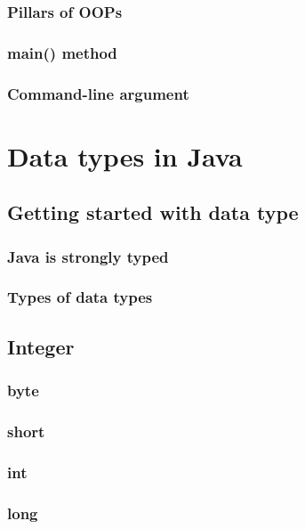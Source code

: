 \documentclass[14pt,fleqn]{extbook} %
\begin{document}
\subsection{Pillars of OOPs}

\subsection{main() method}
 
\subsection{Command-line argument}
 


\chapter{Data types in Java}
\section{Getting started with data type}

\subsection{Java is strongly typed}

\subsection{Types of data types}

\section{Integer}

\subsection{byte}

\subsection{short}

\subsection{int}

\subsection{long}

\end{document}
